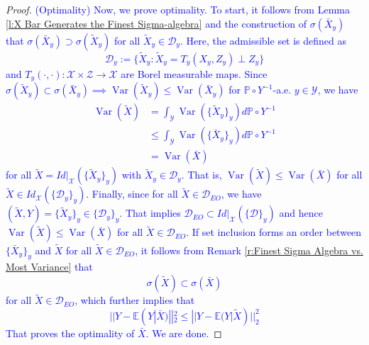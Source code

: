 \documentclass[twoside,11pt]{article}
\DeclareMathOperator{\var}{Var}
\newcommand{\edit}[1]{\textcolor{blue}{#1}}
\begin{document}
\begin{proof}
\edit{(Optimality) Now, we prove optimality. To start, it follows from Lemma \ref{l:X Bar Generates the Finest Sigma-algebra} and the construction of $\sigma(\bar{X}_y)$ that $\sigma(\bar{X}_y) \supset \sigma(\tilde{X}_y)$ for all $\tilde{X}_y \in \mathcal{D}_y$. Here, the admissible set is defined as $$\mathcal{D}_y := \{\tilde{X}_y: \tilde{X}_y = T_y(X_y,Z_y) \perp Z_y \}$$ and $T_y(\cdot,\cdot): \mathcal{X} \times \mathcal{Z} \rightarrow \mathcal{X}$ are Borel measurable maps. Since $\sigma(\tilde{X}_y) \subset \sigma(\bar{X}_y) \implies \var(\tilde{X}_y) \leq \var(\bar{X}_y)$ for $\mathbb{P} \circ Y^{-1}$-a.e. $y \in \mathcal{Y}$, we have \begin{align*}
\var (\tilde{X}) & = \int_{\mathcal{Y}} \var(\{\tilde{X}_y\}_y) d\mathbb{P} \circ Y^{-1}\\
& \leq \int_{\mathcal{Y}} \var(\{\bar{X}_y\}_y) d\mathbb{P} \circ Y^{-1}\\
& = \var(\bar{X})
\end{align*}
for all $\tilde{X} = Id|_{\mathcal{X}}(\{\tilde{X}_y\}_y)$ with $\tilde{X}_y \in \mathcal{D}_y$. That is, $\var (\tilde{X}) \leq  \var(\bar{X})$ for all $\tilde{X} \in Id_{\mathcal{X}}(\{\mathcal{D}_y\}_y)$. Finally, since for all $\tilde{X} \in \mathcal{D}_{EO}$, we have $(\tilde{X},Y) = \{\tilde{X}_y\}_y \in \{\mathcal{D}_y\}_y
$. That implies $\mathcal{D}_{EO} \subset Id|_{\mathcal{X}}(\{\mathcal{D}\}_y)$ and hence $\var(\tilde{X}) \leq \var(\bar{X})$ for all $\tilde{X} \in \mathcal{D}_{EO}$. If set inclusion forms an order between $\{\bar{X}_y\}_y$ and $\tilde{X}$ for all $\tilde{X} \in \mathcal{D}_{EO}$, it follows from Remark \ref{r:Finest Sigma Algebra vs. Most Variance} that $$\sigma(\tilde{X}) \subset \sigma(\bar{X})$$ for all $\tilde{X} \in \mathcal{D}_{EO}$, which further implies that $$||Y - \mathbb{E}(Y|\bar{X})||_2^2 \leq ||Y - \mathbb{E}(Y|\tilde{X})||_2^2$$ That proves the optimality of $\bar{X}$. We are done.}
\end{proof}
\fi




\vskip 0.2in

\end{document}
